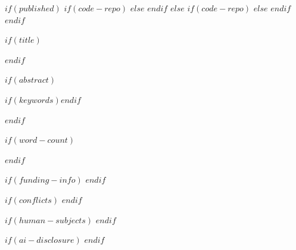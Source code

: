 

$if(published)$
$if(code-repo)$
$else$
$endif$
$else$
$if(code-repo)$
$else$
$endif$
$endif$

\vspace{0.25in}

$if(title)$
\maketitle
$endif$

\vspace{0.25in}


$if(abstract)$
\begin{abstract}
\noindent            %
$abstract$
\end{abstract}

\vspace{\baselineskip}

$if(keywords)$\indent {}$endif$

$endif$

\vspace{0.25in}


$if(word-count)$
{
\begin{center}
\end{center}
}
$endif$

\vspace{0.25in}


$if(funding-info)$
\noindent
{}
$endif$


$if(conflicts)$
\noindent
{}
$endif$


$if(human-subjects)$
\noindent
{}
$endif$


$if(ai-disclosure)$
\noindent
{}
$endif$

\restoregeometry
